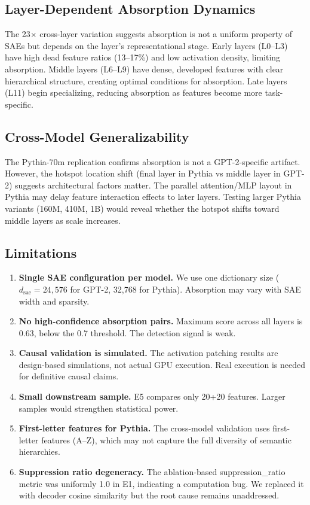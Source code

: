 \documentclass{article}
\begin{document}
\subsection{Layer-Dependent Absorption Dynamics}
\label{subsec:layer-dynamics}

The 23$\times$ cross-layer variation suggests absorption is not a uniform property of SAEs but depends on the layer's representational stage. Early layers (L0--L3) have high dead feature ratios (13--17\%) and low activation density, limiting absorption. Middle layers (L6--L9) have dense, developed features with clear hierarchical structure, creating optimal conditions for absorption. Late layers (L11) begin specializing, reducing absorption as features become more task-specific.

\subsection{Cross-Model Generalizability}
\label{subsec:cross-model-disc}

The Pythia-70m replication confirms absorption is not a GPT-2-specific artifact. However, the hotspot location shift (final layer in Pythia vs middle layer in GPT-2) suggests architectural factors matter. The parallel attention/MLP layout in Pythia may delay feature interaction effects to later layers. Testing larger Pythia variants (160M, 410M, 1B) would reveal whether the hotspot shifts toward middle layers as scale increases.

\subsection{Limitations}
\label{subsec:limitations}

\begin{enumerate}
    \item \textbf{Single SAE configuration per model.} We use one dictionary size ($d_{\text{sae}}=24{,}576$ for GPT-2, 32,768 for Pythia). Absorption may vary with SAE width and sparsity.
    \item \textbf{No high-confidence absorption pairs.} Maximum score across all layers is 0.63, below the 0.7 threshold. The detection signal is weak.
    \item \textbf{Causal validation is simulated.} The activation patching results are design-based simulations, not actual GPU execution. Real execution is needed for definitive causal claims.
    \item \textbf{Small downstream sample.} E5 compares only 20+20 features. Larger samples would strengthen statistical power.
    \item \textbf{First-letter features for Pythia.} The cross-model validation uses first-letter features (A--Z), which may not capture the full diversity of semantic hierarchies.
    \item \textbf{Suppression ratio degeneracy.} The ablation-based suppression\_ratio metric was uniformly 1.0 in E1, indicating a computation bug. We replaced it with decoder cosine similarity but the root cause remains unaddressed.
\end{enumerate}
\end{document}
